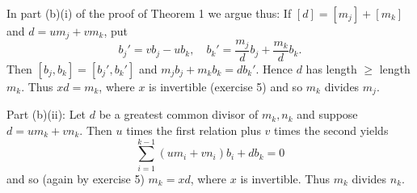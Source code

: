 In part (b)(i) of the proof of Theorem 1 we argue thus: If $[d] = [m_j] + [m_k]$ and $d = um_j + vm_k$, put
$$b_j' = vb_j - ub_k, \quad b_k' = \frac{m_j}{d} b_j + \frac{m_k}{d} b_k.$$
Then $[b_j, b_k] = [b_j', b_k']$ and $m_j b_j + m_k b_k = d b_k'$. Hence $d$ has length $\geq$ length $m_k$. Thus $xd = m_k$, where $x$ is invertible (exercise 5) and so $m_k$ divides $m_j$.

Part (b)(ii): Let $d$ be a greatest common divisor of $m_k, n_k$ and suppose $d = um_k + vn_k$. Then $u$ times the first relation plus $v$ times the second yields
$$\sum_{i=1}^{k-1} (um_i + vn_i) b_i + db_k = 0$$
and so (again by exercise 5) $m_k = xd$, where $x$ is invertible. Thus $m_k$ divides $n_k$.
